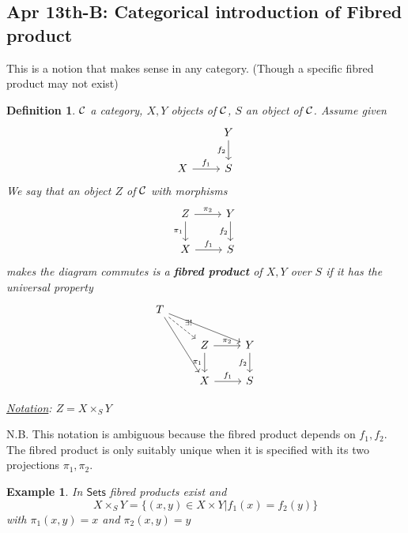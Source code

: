 \documentclass[11pt]{article}
\newtheorem{dfn}[thm]{Definition}
\newtheorem{ex}[thm]{Example}
\newcommand{\calc}{{\cal C}}
\begin{document}
\subsection{Apr 13th-B: Categorical introduction of Fibred product}
This is a notion that makes sense in any category. (Though a specific fibred product may not exist)
\begin{dfn}
$\calc$ a category, $X,Y$ objects of $\calc$, $S$ an object of $\calc$. Assume given
$$
\begin{tikzcd}
 & Y \arrow[d, "f_2"'] \\
X \arrow[r, "f_1"] & S
\end{tikzcd}
$$
We say that an object $Z$ of $\calc$ with morphisms 
$$
\begin{tikzcd}
Z \arrow[r, "\pi_2"] \arrow[d, "\pi_1"'] & Y \arrow[d, "f_2"'] \\
X \arrow[r, "f_1"] & S
\end{tikzcd}
$$
makes the diagram commutes is a \textbf{fibred product} of $X,Y$ over $S$ if it has the universal property
$$
\begin{tikzcd}
T \arrow[rdd] \arrow[rrd] \arrow[rd, "\exists!", dashed] &  &  \\
 & Z \arrow[r, "\pi_2"] \arrow[d, "\pi_1"'] & Y \arrow[d, "f_2"'] \\
 & X \arrow[r, "f_1"] & S
\end{tikzcd}
$$

\underline{Notation}: $Z=X\times_S Y$
\end{dfn}
N.B. This notation is ambiguous because the fibred product depends on $f_1,f_2$. The fibred product is only suitably unique when it is specified with its two projections $\pi_1,\pi_2$.
\begin{ex}
In $\mathsf{Sets}$ fibred products exist and
$$
X\times_S Y=\{(x,y)\in X\times Y|f_1(x)=f_2(y)\}
$$
with $\pi_1(x,y)=x$ and $\pi_2(x,y)=y$
\end{ex}
\end{document}
